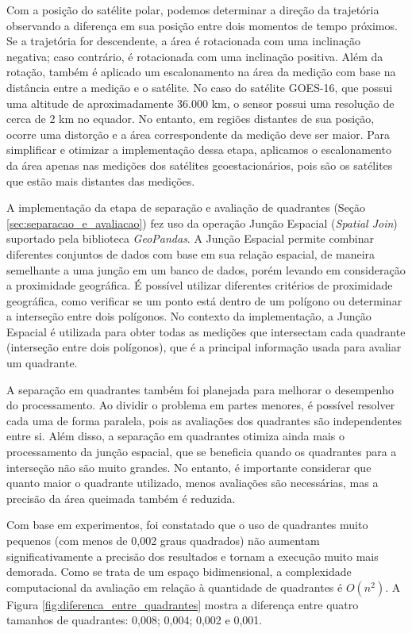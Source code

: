 \documentclass[cic,tc]{iiufrgs}
\begin{document}
Com a posição do satélite polar, podemos determinar a direção da trajetória observando a diferença em sua posição entre dois momentos de tempo próximos. Se a trajetória for descendente, a área é rotacionada com uma inclinação negativa; caso contrário, é rotacionada com uma inclinação positiva. Além da rotação, também é aplicado um escalonamento na área da medição com base na distância entre a medição e o satélite. No caso do satélite GOES-16, que possui uma altitude de aproximadamente 36.000 km, o sensor possui uma resolução de cerca de 2 km no equador. No entanto, em regiões distantes de sua posição, ocorre uma distorção e a área correspondente da medição deve ser maior. Para simplificar e otimizar a implementação dessa etapa, aplicamos o escalonamento da área apenas nas medições dos satélites geoestacionários, pois são os satélites que estão mais distantes das medições.

A implementação da etapa de separação e avaliação de quadrantes (Seção \ref{sec:separacao_e_avaliacao}) fez uso da operação Junção Espacial (\textit{Spatial Join}) suportado pela biblioteca \textit{GeoPandas}. A Junção Espacial permite combinar diferentes conjuntos de dados com base em sua relação espacial, de maneira semelhante a uma junção em um banco de dados, porém levando em consideração a proximidade geográfica. É possível utilizar diferentes critérios de proximidade geográfica, como verificar se um ponto está dentro de um polígono ou determinar a interseção entre dois polígonos. No contexto da implementação, a Junção Espacial é utilizada para obter todas as medições que intersectam cada quadrante (interseção entre dois polígonos), que é a principal informação usada para avaliar um quadrante.

A separação em quadrantes também foi planejada para melhorar o desempenho do processamento. Ao dividir o problema em partes menores, é possível resolver cada uma de forma paralela, pois as avaliações dos quadrantes são independentes entre si. Além disso, a separação em quadrantes otimiza ainda mais o processamento da junção espacial, que se beneficia quando os quadrantes para a interseção não são muito grandes. No entanto, é importante considerar que quanto maior o quadrante utilizado, menos avaliações são necessárias, mas a precisão da área queimada também é reduzida.

Com base em experimentos, foi constatado que o uso de quadrantes muito pequenos (com menos de 0,002 graus quadrados) não aumentam significativamente a precisão dos resultados e tornam a execução muito mais demorada. Como se trata de um espaço bidimensional, a complexidade computacional da avaliação em relação à quantidade de quadrantes é $O(n^2)$. A Figura \ref{fig:diferenca_entre_quadrantes} mostra a diferença entre quatro tamanhos de quadrantes: 0,008; 0,004; 0,002 e 0,001.
\end{document}
